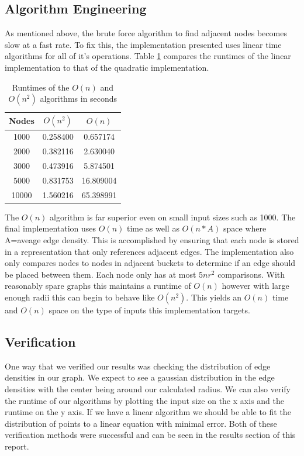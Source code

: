 \documentclass{article}
\begin{document}
  \subsection{Algorithm Engineering}
    As mentioned above, the brute force algorithm to find adjacent nodes becomes slow at a fast rate.
    To fix this, the implementation presented uses linear time algorithms for all of it's operations.
	  Table \ref{runtime_comparison_table_brute} compares the runtimes of the linear implementation to that of the quadratic implementation.

	  \begin{table}
      \centering
      \label{runtime_comparison_table_brute}
  		\begin{tabular}{ |c|c|c| }
  			\hline
  			Nodes & $O(n^2)$ & $O(n)$ \\
  			\hline
  			  1000 & 0.258400 & 0.657174 \\
  			  \hline
  			  2000 & 0.382116 & 2.630040 \\
  			  \hline
  			  3000 & 0.473916 & 5.874501 \\
  			  \hline
  			  5000 & 0.831753 & 16.809004 \\
  			  \hline
  			  10000 & 1.560216 & 65.398991 \\
  			\hline
  		\end{tabular}
  		\caption{Runtimes of the $O(n)$ and $O(n^2)$ algorithms in seconds}
	  \end{table}

	  The $O(n)$ algorithm is far superior even on small input sizes such as 1000.
    The final implementation uses $O(n)$ time as well as $O(n*A)$ space where A=aveage edge density.
    This is accomplished by ensuring that each node is stored in a representation that only references adjacent edges.
    The implementation also only compares nodes to nodes in adjacent buckets to determine if an edge should be placed between them.
    Each node only has at most $5nr^2$ comparisons\cite{chen2017bipartite}.
    With reasonably spare graphs this maintains a runtime of $O(n)$ however with large enough radii this can begin to behave like $O(n^2)$.
    This yields an $O(n)$ time and $O(n)$ space on the type of inputs this implementation targets.

	\subsection{Verification}
		One way that we verified our results was checking the distribution of edge densities in our graph.
		We expect to see a gaussian distribution in the edge densities with the center being around our calculated radius.
		We can also verify the runtime of our algorithms by plotting the input size on the x axis and the runtime on the y axis.
		If we have a linear algorithm we should be able to fit the distribution of points to a linear equation with minimal error.
		Both of these verification methods were successful and can be seen in the results section of this report.
\end{document}
